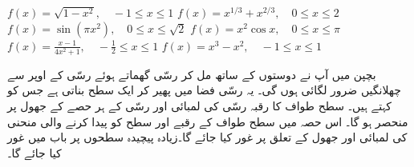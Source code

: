 $f(x)=\sqrt{1-x^2},\quad -1\le x\le 1$
$f(x)=x^{1/3}+x^{2/3},\quad 0\le x\le 2$
$f(x)=\sin(\pi x^2),\quad 0\le x\le \sqrt{2}$
$f(x)=x^2\cos x,\quad 0\le x\le \pi$
$f(x)=\tfrac{x-1}{4x^2+1},\quad -\tfrac{1}{2}\le x\le 1$
$f(x)=x^3-x^2,\quad -1\le x\le 1$



بچپن میں آپ نے دوستوں کے ساتھ مل کر رسّی گھماتے ہوئے رسّی کے اوپر سے چھلانگیں ضرور لگائی ہوں گی۔ یہ رسّی فضا میں پھیر  کر ایک سطح بناتی ہے جس کو  کہتے ہیں۔ سطح طواف کا رقبہ رسّی کی لمبائی اور رسّی کے ہر حصے کے جھول پر منحصر ہو گا۔ اس حصہ میں سطح طواف کے  رقبے  اور سطح کو پیدا کرنے والی منحنی کی لمبائی اور جھول کے تعلق پر غور کیا جائے گا۔زیادہ پیچیدہ سطحوں پر  باب   میں غور کیا جائے گا۔

